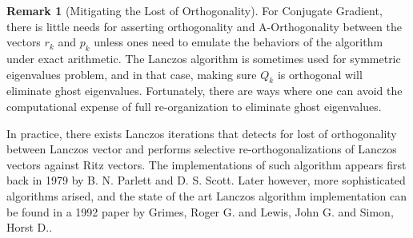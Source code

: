 \documentclass[]{article}
\theoremstyle{definition}
\newtheorem{remark}{Remark}[subsection]  %
\begin{document}
        \begin{remark}[Mitigating the Lost of Orthogonality]
            For Conjugate Gradient, there is little needs for asserting orthogonality and A-Orthogonality between the vectors $r_k$ and $p_k$ unless ones need to emulate the behaviors of the algorithm under exact arithmetic. The Lanczos algorithm is sometimes used for symmetric eigenvalues problem, and in that case, making sure $Q_k$ is orthogonal will eliminate ghost eigenvalues. Fortunately, there are ways where one can avoid the computational expense of full re-organization to eliminate ghost eigenvalues. 
            \par
            In practice, there exists Lanczos iterations that detects for lost of orthogonality between Lanczos vector and performs selective re-orthogonalizations of Lanczos vectors against Ritz vectors. The implementations of such algorithm appears first back in 1979 by B. N. Parlett and D. S. Scott\cite{article:lanso}. Later however, more sophisticated algorithms arised, and the state of the art Lanczos algorithm implementation can be found in a 1992 paper by Grimes, Roger G. and Lewis, John G. and Simon, Horst D.\cite{article:shifted_block_lanczos}. 
        \end{remark}
        
\end{document}
